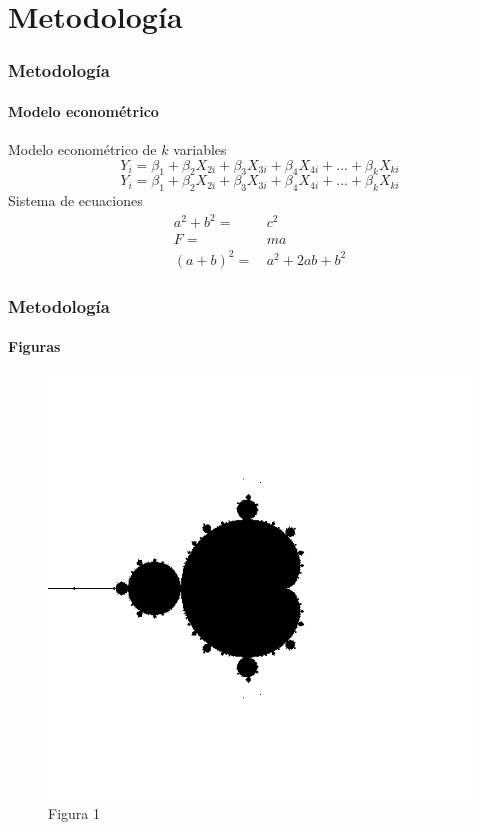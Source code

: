 \documentclass[11pt, aspectratio = 169]{beamer}
\begin{document}
    \section{Metodología}
        \begin{frame}
            \frametitle{Metodología}
            \framesubtitle{Modelo econométrico}
            Modelo econométrico de $k$ variables
                \begin{equation}
                    Y_{i} = \beta_{1} + \beta_{2}X_{2i} + \beta_{3}X_{3i} + 
                    \beta_{4}X_{4i} + ... + 
                    \beta_{k}X_{ki}
                \end{equation}
                \begin{equation*}
                    Y_{i} = \beta_{1} + \beta_{2}X_{2i} + \beta_{3}X_{3i} + 
                    \beta_{4}X_{4i} + ... + 
                    \beta_{k}X_{ki}
                \end{equation*}
            Sistema de ecuaciones 
                \begin{align*}
                    a^{2} + b^{2}=&\, c^{2} \\
                    F =&\, ma \\
                    (a + b)^{2} =&\, a^{2} + 2ab + b^{2} 
                \end{align*}
        \end{frame}
        \begin{frame}
            \frametitle{Metodología}
            \framesubtitle{Figuras}
            \begin{figure}[H]
                \centering
                \caption{Figura 1}
                \includegraphics[scale = 0.3]{figura1.png}
            \end{figure}
        \end{frame}
\end{document}
